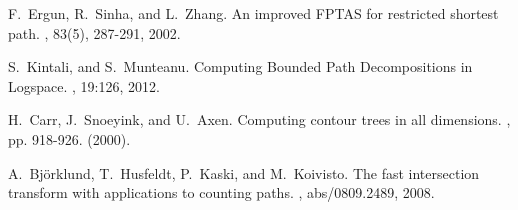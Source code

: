\documentclass[a4paper,11pt]{report}
\theoremstyle{plain}
\theoremstyle{definition}
\begin{document}
\begin{thebibliography}{10}
F.~Ergun, R.~Sinha, and L.~Zhang.
\newblock An improved FPTAS for restricted shortest path.
, 83(5), 287-291, 2002.

S.~Kintali, and S.~Munteanu.
\newblock Computing Bounded Path Decompositions in Logspace.
, 19:126, 2012.

H.~Carr, J.~Snoeyink, and U.~Axen.
\newblock Computing contour trees in all dimensions.
, pp. 918-926. (2000).

A.~Bj{\"o}rklund, T.~Husfeldt, P.~Kaski, and M.~Koivisto.
\newblock The fast intersection transform with applications to counting paths.
, abs/0809.2489, 2008.

\end{thebibliography}
\end{document}
